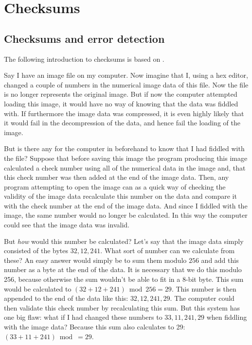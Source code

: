 \begin{comment}
  
\end{comment}

\chapter{Checksums}
\label{cha:crc}

\section{Checksums and error detection}

The following introduction to checksums is based on
\cite{Williams_1993_crc_painless,barr:_addit_check,tanenbaum2003computernetworks_crc,Nelson:1992:FVU:135011.135017_crc32}.

Say I have an image file on my computer. Now imagine that I, using a
hex editor, changed a couple of numbers in the numerical image data of
this file. Now the file is no longer represents the original
image. But if now the computer attempted loading this image, it would
have no way of knowing that the data was fiddled with. If furthermore
the image data was compressed, it is even highly likely that it would
fail in the decompression of the data, and hence fail the loading of
the image.

But is there any for the computer in beforehand to know that I had
fiddled with the file? Suppose that before saving this image the
program producing this image calculated a check number using all of
the numerical data in the image and, that this check number was then
added at the end of the image data. Then, any program attempting to
open the image can as a quick way of checking the validity of the
image data recalculate this number on the data and compare it with the
check number at the end of the image data. And since I fiddled with
the image, the same number would no longer be calculated. In this way
the computer could see that the image data was invalid.

But \textit{how} would this number be calculated? Let's say that the
image data simply consisted of the bytes $32,12,241$. What sort of
number can we calculate from these? An easy answer would simply be to
sum them modulo $256$ and add this number as a byte at the end of the
data. It is necessary that we do this modulo 256, because otherwise
the sum wouldn't be able to fit in a 8-bit byte. This sum would be
calculated to $(32 + 12 + 241) \bmod 256 = 29$. This number is then
appended to the end of the data like this: $32,12,241,29$. The
computer could then validate this check number by recalculating this
sum. But this system has one big flaw: what if I had changed these
numbers to $33,11,241, 29$ when fiddling with the image data?  Because
this sum also calculates to 29: $(33 + 11 + 241) \bmod = 29$.

